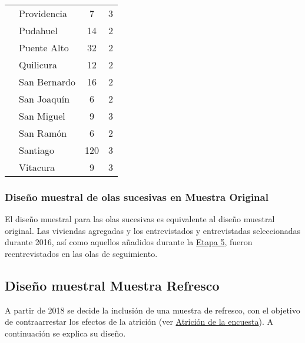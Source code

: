 \documentclass[
  12pt,
]{article}
\begin{document}
\begin{longtable}[t]{llcc}
\hspace{1em} & Providencia & 7 & 3\\
\hspace{1em} & Pudahuel & 14 & 2\\
\hspace{1em} & Puente Alto & 32 & 2\\
\hspace{1em} & Quilicura & 12 & 2\\
\hspace{1em} & San Bernardo & 16 & 2\\
\hspace{1em} & San Joaquín & 6 & 2\\
\hspace{1em} & San Miguel & 9 & 3\\
\hspace{1em} & San Ramón & 6 & 2\\
\hspace{1em} & Santiago & 120 & 3\\
\hspace{1em} & Vitacura & 9 & 3\\*
\end{longtable}

\hypertarget{diseuxf1o-muestral-de-olas-sucesivas-en-muestra-original}{%
\subsubsection*{Diseño muestral de olas sucesivas en Muestra Original}\label{diseuxf1o-muestral-de-olas-sucesivas-en-muestra-original}}

El diseño muestral para las olas sucesivas es equivalente al diseño muestral original. Las viviendas agregadas y los entrevistados y entrevistadas seleccionadas durante 2016, así como aquellos añadidos durante la \protect\hyperlink{etapa5}{Etapa 5}, fueron reentrevistados en las olas de seguimiento.

\hypertarget{dis_muest_refresco}{%
\subsection{Diseño muestral Muestra Refresco}\label{dis_muest_refresco}}

A partir de 2018 se decide la inclusión de una muestra de refresco, con el objetivo de contraarrestar los efectos de la atrición (ver \protect\hyperlink{atricion}{Atrición de la encuesta}). A continuación se explica su diseño.
\end{document}
